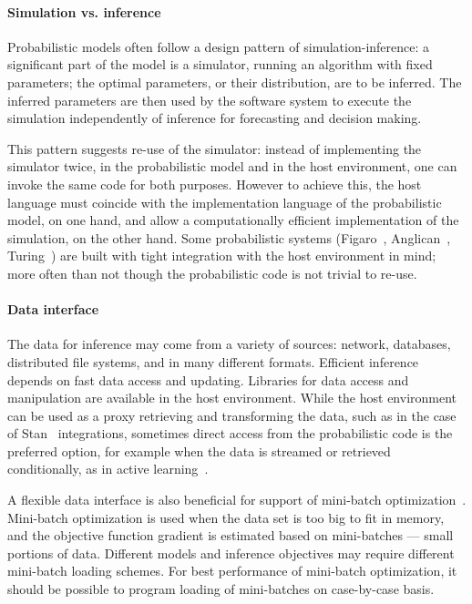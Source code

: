 \documentclass[sigplan,review,10pt,anonymous]{acmart}
\begin{document}
\begin{sloppypar}
\paragraph{Simulation vs. inference} Probabilistic models
often follow a design pattern of simulation-inference: a
significant part of the model is a simulator, running an
algorithm with fixed parameters; the optimal parameters, or
their distribution, are to be inferred. The inferred parameters
are then used by the software system to execute the simulation
independently of inference for forecasting and decision making.

This pattern suggests re-use of the simulator: instead of
implementing the simulator twice, in the probabilistic model and
in the host environment, one can invoke the same code for both
purposes.  However to achieve this, the host language must
coincide with the implementation language of the probabilistic
model, on one hand, and allow a computationally efficient
implementation of the simulation, on the other hand. Some
probabilistic systems (Figaro~\cite{P09},
Anglican~\cite{TMY+16}, Turing~\cite{GXG18}) are built with
tight integration with the host environment in mind; more often
than not though the probabilistic code is not trivial to re-use.

\paragraph{Data interface} The data for inference may come from
a variety of sources: network, databases, distributed file
systems, and in many different formats. Efficient inference
depends on fast data access and updating. Libraries for data
access and manipulation are available in the host environment.
While the host environment can be used as a proxy retrieving and
transforming the data, such as in the case of Stan~\cite{Stan17}
integrations, sometimes direct access from the probabilistic
code is the preferred option, for example when the data is
streamed or retrieved conditionally, as in active
learning~\cite{SLB15}.

A flexible data interface is also beneficial for support of
mini-batch optimization~\cite{LZC+14}. Mini-batch optimization
is used when the data set is too big to fit in memory, and the
objective function gradient is estimated based on mini-batches
--- small portions of data. Different models and inference
objectives may require different mini-batch loading schemes.
For best performance of mini-batch optimization, it should be
possible to program loading of mini-batches on case-by-case
basis.


\end{sloppypar}
\end{document}
